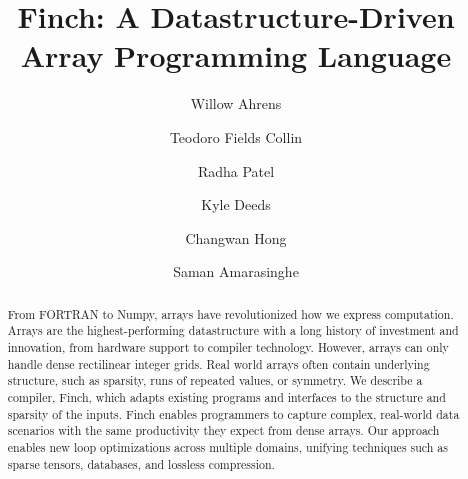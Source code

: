 \documentclass[acmsmall]{acmart}
\begin{document}
\title{Finch: A Datastructure-Driven Array Programming Language}

\author{Willow Ahrens}

\author{Teodoro Fields Collin}

\author{Radha Patel}

\author{Kyle Deeds}

\author{Changwan Hong}

\author{Saman Amarasinghe}

\renewcommand{\shortauthors}{Ahrens et al.}

\begin{abstract}
From FORTRAN to Numpy, arrays have revolutionized how we express computation.  Arrays are the highest-performing datastructure with a long history of investment and innovation, from hardware support to compiler technology.  However, arrays can only handle dense rectilinear integer grids. Real world arrays often contain underlying structure, such as sparsity, runs of repeated values, or symmetry. We describe a compiler, Finch, which adapts existing programs and interfaces to the structure and sparsity of the inputs. Finch enables programmers to capture complex, real-world data scenarios with the same productivity they expect from dense arrays. Our approach enables new loop optimizations across multiple domains, unifying techniques such as sparse tensors, databases, and lossless compression. 
\end{abstract}
\end{document}
